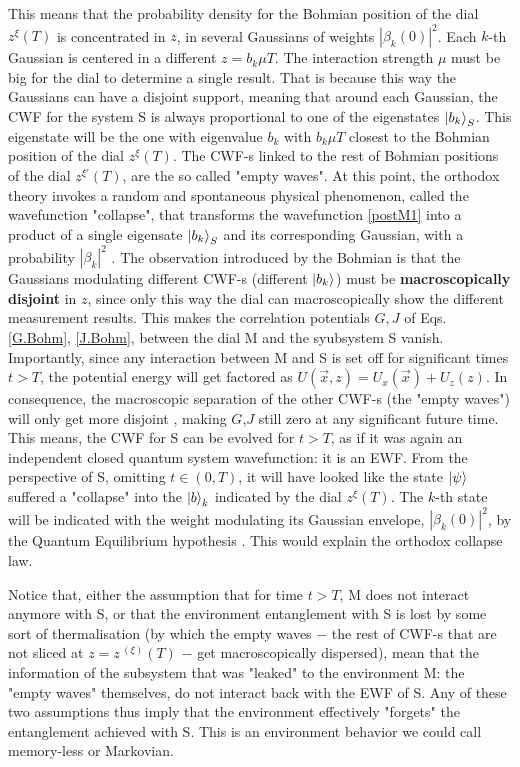 \documentclass[11pt, a4paper]{article} %
\begin{document}
This means that the probability density for the Bohmian position of the dial $z^\xi(T)$ is concentrated in $z$, in several Gaussians of weights $|\beta_k(0)|^2$. Each $k$-th Gaussian is centered in a different $z=b_k \mu T$. The interaction strength $\mu$ must be big for the dial to determine a single result. That is because this way the Gaussians can have a disjoint support, meaning that around each Gaussian, the CWF for the system S is always proportional to one of the eigenstates $\ket{b_k}_S$. This eigenstate will be the one with eigenvalue $b_k$ with $b_k\mu T$ closest to the Bohmian position of the dial $z^\xi(T)$.  The CWF-s linked to the rest of Bohmian positions of the dial $z^{\xi'}(T)$, are the so called "empty waves". At this point, the orthodox theory invokes a random and spontaneous physical phenomenon, called the wavefunction "collapse", that transforms the wavefunction \eqref{postM1} into a product of a single eigensate $\ket{b_k}_S$ and its corresponding Gaussian, with a probability $|\beta_k|^2$ \cite{vonNeumann}. The observation introduced by the Bohmian is that the Gaussians modulating different CWF-s (different $\ket{b_k}$) must be {\bf macroscopically disjoint} in $z$, since only this way the dial can macroscopically show the different measurement results. This makes the correlation potentials $G,J$ of Eqs. \eqref{G.Bohm}, \eqref{J.Bohm}, between the dial M and the syubsystem S vanish. Importantly, since any interaction between M and S is set off for significant times $t>T$, the potential energy will get factored as $U(\vec{x},z)=U_x(\vec{x})+U_z(z)$. In consequence, the macroscopic separation of the other CWF-s (the "empty waves") will only get more disjoint \cite{Absolute}, making $G$,$J$ still zero at any significant future time. This means, the CWF for S can be evolved for $t>T$, as if it was again an independent closed quantum system wavefunction: it is an EWF. From the perspective of S, omitting $t\in(0,T)$, it will have looked like the state $\ket{\psi}$ suffered a "collapse" into the $\ket{b}_k$ indicated by the dial $z^\xi(T)$. The $k$-th state will be indicated with the weight modulating its Gaussian envelope, $|\beta_k(0)|^2$, by the Quantum Equilibrium hypothesis \cite{Absolute}. This would explain the orthodox collapse law.


Notice that, either the assumption that for time $t>T$, M does not interact anymore with S, or that the environment entanglement with S is lost by some sort of thermalisation (by which the empty waves $-$ the rest of CWF-s that are not sliced at $z=z^{\:(\xi)}(T)$ $-$ get macroscopically dispersed), mean that the information of the subsystem that was "leaked" to the environment M: the "empty waves" themselves, do not interact back with the EWF of S. Any of these two assumptions thus imply that the environment effectively "forgets" the entanglement achieved with S. This is an environment behavior we could call memory-less or Markovian.%
\end{document}
